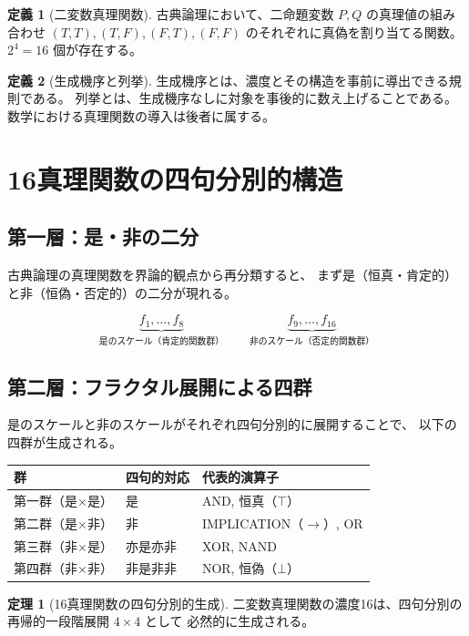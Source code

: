 \documentclass[11pt,a4paper]{article}
\theoremstyle{definition}
\newtheorem{definition}{定義}[section]
\newtheorem{theorem}{定理}[section]
\begin{document}
\begin{definition}[二変数真理関数]
古典論理において、二命題変数 $P, Q$ の真理値の組み合わせ
$(T,T),(T,F),(F,T),(F,F)$ のそれぞれに真偽を割り当てる関数。
$2^4 = 16$ 個が存在する。
\end{definition}

\begin{definition}[生成機序と列挙]
生成機序とは、濃度とその構造を事前に導出できる規則である。
列挙とは、生成機序なしに対象を事後的に数え上げることである。
数学における真理関数の導入は後者に属する。
\end{definition}

\section{16真理関数の四句分別的構造}

\subsection{第一層：是・非の二分}

古典論理の真理関数を界論的観点から再分類すると、
まず是（恒真・肯定的）と非（恒偽・否定的）の二分が現れる。

\[
\underbrace{f_1,\ldots,f_8}_{\text{是のスケール（肯定的関数群）}}
\qquad
\underbrace{f_9,\ldots,f_{16}}_{\text{非のスケール（否定的関数群）}}
\]

\subsection{第二層：フラクタル展開による四群}

是のスケールと非のスケールがそれぞれ四句分別的に展開することで、
以下の四群が生成される。

\begin{center}
\begin{tabular}{lll}
\toprule
群 & 四句的対応 & 代表的演算子 \\
\midrule
第一群（是×是） & 是 & AND, 恒真（$\top$） \\
第二群（是×非） & 非 & IMPLICATION（$\to$）, OR \\
第三群（非×是） & 亦是亦非 & XOR, NAND \\
第四群（非×非） & 非是非非 & NOR, 恒偽（$\bot$） \\
\bottomrule
\end{tabular}
\end{center}

\begin{theorem}[16真理関数の四句分別的生成]
二変数真理関数の濃度16は、四句分別の再帰的一段階展開 $4 \times 4$ として
必然的に生成される。
\end{theorem}
\end{document}
